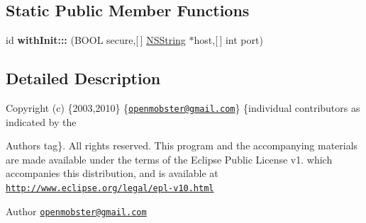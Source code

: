 \subsection*{\-Static \-Public \-Member \-Functions}
\begin{DoxyCompactItemize}
\item 
\hypertarget{interface_net_session_aec2604b1d4473f35d216614ff200063a}{
id {\bfseries with\-Init\-:::} (\-B\-O\-O\-L secure,\mbox{[}$\,$\mbox{]} \hyperlink{class_n_s_string}{\-N\-S\-String} $\ast$host,\mbox{[}$\,$\mbox{]} int port)}
\label{interface_net_session_aec2604b1d4473f35d216614ff200063a}

\end{DoxyCompactItemize}


\subsection{\-Detailed \-Description}
\-Copyright (c) \{2003,2010\} \{\href{mailto:openmobster@gmail.com}{\tt openmobster@gmail.\-com}\} \{individual contributors as indicated by the \begin{DoxyAuthor}{\-Authors}
tag\}. \-All rights reserved. \-This program and the accompanying materials are made available under the terms of the \-Eclipse \-Public \-License v1. which accompanies this distribution, and is available at \href{http://www.eclipse.org/legal/epl-v10.html}{\tt http\-://www.\-eclipse.\-org/legal/epl-\/v10.\-html}
\end{DoxyAuthor}
\begin{DoxyAuthor}{\-Author}
\href{mailto:openmobster@gmail.com}{\tt openmobster@gmail.\-com} 
\end{DoxyAuthor}


